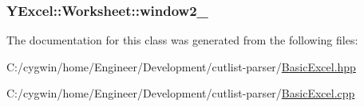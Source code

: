 \subsubsection[{window2\+\_\+}]{ Y\+Excel\+::\+Worksheet\+::window2\+\_\+}\label{class_y_excel_1_1_worksheet_a4059541c8ad934753d5595d82b90f982}


The documentation for this class was generated from the following files\+:\begin{DoxyCompactItemize}
\item 
C\+:/cygwin/home/\+Engineer/\+Development/cutlist-\/parser/\hyperlink{_basic_excel_8hpp}{Basic\+Excel.\+hpp}\item 
C\+:/cygwin/home/\+Engineer/\+Development/cutlist-\/parser/\hyperlink{_basic_excel_8cpp}{Basic\+Excel.\+cpp}\end{DoxyCompactItemize}
